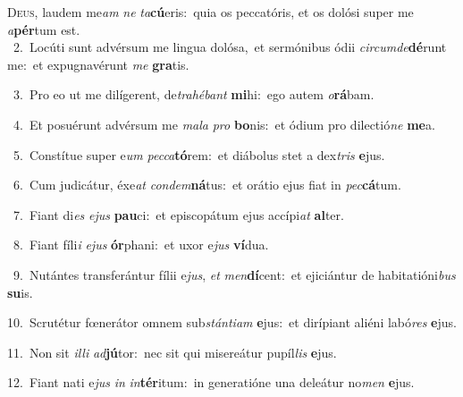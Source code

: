 \lettrine{\initial\textcolor{\initialcolor}{D}}{eus,} laudem me\textit{am} \textit{ne} \textit{ta}\-\textbf{cú}eris:~\star quia os peccatóris, et os dolósi super me \textit{a}\-\textbf{pér}tum est.\\
{\numbfont\textcolor{\numbcolor}{~2.}}~Locúti sunt advérsum me lingua dolósa,~\dagger et sermónibus ódii \textit{cir}\-\textit{cum}\textit{de}\textbf{dé}runt me:~\star et expugnavérunt \textit{me} \textbf{gra}\-tis.\par
{\numbfont\textcolor{\numbcolor}{~3.}}~Pro eo ut me dilígerent, de\-\textit{tra}\-\textit{hé}\textit{bant} \textbf{mi}\-hi:~\star ego autem \textit{o}\-\textbf{rá}bam.\par
{\numbfont\textcolor{\numbcolor}{~4.}}~Et posuérunt advérsum me \textit{ma}\-\textit{la} \textit{pro} \textbf{bo}\-nis:~\star et ódium pro dilectió\textit{ne} \textbf{me}\-a.\par
{\numbfont\textcolor{\numbcolor}{~5.}}~Constítue super e\textit{um} \textit{pec}\-\textit{ca}\textbf{tó}rem:~\star et diábolus stet a dex\textit{tris} \textbf{e}\-jus.\par
{\numbfont\textcolor{\numbcolor}{~6.}}~Cum judicátur, éxe\textit{at} \textit{con}\-\textit{dem}\textbf{ná}tus:~\star et orátio ejus fiat in \textit{pec}\-\textbf{cá}tum.\par
{\numbfont\textcolor{\numbcolor}{~7.}}~Fiant di\textit{es} \textit{e}\-\textit{jus} \textbf{pau}\-ci:~\star et episcopátum ejus accípi\textit{at} \textbf{al}\-ter.\par
{\numbfont\textcolor{\numbcolor}{~8.}}~Fiant fíli\textit{i} \textit{e}\-\textit{jus} \textbf{ór}\-phani:~\star et uxor e\textit{jus} \textbf{ví}\-dua.\par
{\numbfont\textcolor{\numbcolor}{~9.}}~Nutántes transferántur fílii e\-\textit{jus}\-, \textit{et} \textit{men}\-\textbf{dí}cent:~\star et ejiciántur de habitatióni\textit{bus} \textbf{su}\-is.\par
{\numbfont\textcolor{\numbcolor}{10.}}~Scrutétur fœnerátor omnem sub\-\textit{stán}\-\textit{ti}\textit{am} \textbf{e}\-jus:~\star et dirípiant aliéni labó\textit{res} \textbf{e}\-jus.\par
{\numbfont\textcolor{\numbcolor}{11.}}~Non sit \textit{il}\-\textit{li} \textit{ad}\-\textbf{jú}tor:~\star nec sit qui misereátur pupíl\textit{lis} \textbf{e}\-jus.\par
{\numbfont\textcolor{\numbcolor}{12.}}~Fiant nati e\textit{jus} \textit{in} \textit{in}\-\textbf{tér}itum:~\star in generatióne una deleátur no\textit{men} \textbf{e}\-jus.\par
